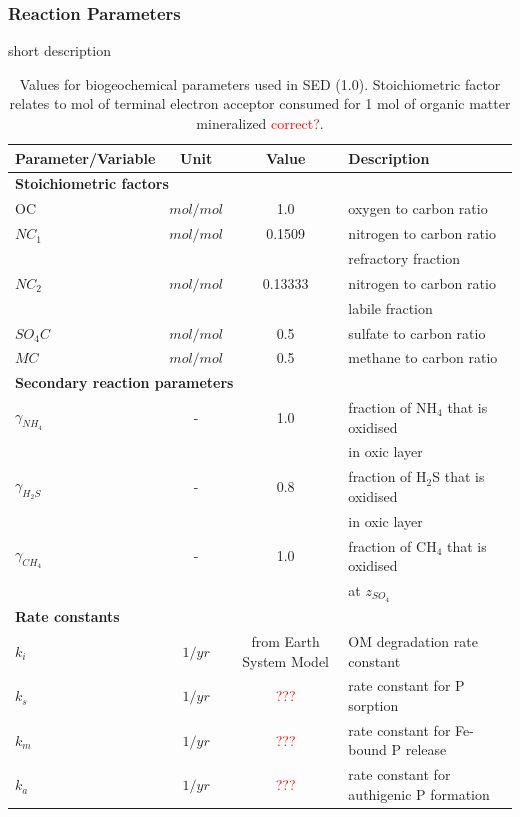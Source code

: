 \documentclass[gmd, manuscript]{copernicus}
\begin{document}
\subsubsection {Reaction Parameters}
short description
\begin{table}[hbtp]
\caption{Values for biogeochemical parameters used in SED (1.0). Stoichiometric factor relates to mol of terminal electron acceptor consumed for 1 mol of organic matter mineralized \textcolor{red}{correct?}.}

\centering
\begin{tabular}{l c c l}
\hline\hline
Parameter/Variable & Unit  & Value & Description\\
\hline
\multicolumn{4}{l}{\textbf{Stoichiometric factors}}\\
OC & $mol/mol$ & 1.0 & oxygen to carbon ratio\\
$NC_1$ & $mol/mol$ & 0.1509 & nitrogen to carbon ratio\\
& & & refractory fraction\\
$NC_2$ & $mol/mol$ & 0.13333 & nitrogen to carbon ratio\\
& & & labile fraction\\
$SO_4C$ & $mol/mol$ & 0.5 & sulfate to carbon ratio\\
$MC$ & $mol/mol$ & 0.5 & methane to carbon ratio\\
\multicolumn{4}{l}{\textbf{Secondary reaction parameters}}\\
$\gamma_{NH_4}$ & - & 1.0 & fraction of NH$_4$ that is oxidised\\
& & & in oxic layer\\
$\gamma_{H_2S}$ & - & 0.8 & fraction of H$_2$S that is oxidised\\
& & & in oxic layer\\
$\gamma_{CH_4}$ & - & 1.0 & fraction of CH$_4$ that is oxidised\\
& & & at $z_{SO_4}$\\
\multicolumn{4}{l}{\textbf{Rate constants}}\\
$k_i$ & $1/yr$ & from Earth System Model & OM degradation rate constant\\
$k_s$ & $1/yr$ & \textcolor{red}{???} & rate constant for P sorption\\
$k_m$ & $1/yr$ & \textcolor{red}{???} & rate constant for Fe-bound P release\\
$k_a$ & $1/yr$ & \textcolor{red}{???} & rate constant for authigenic P formation\\

\hline\hline
\end{tabular}
\label{table:reaction_parameters}
\end{table}
\end{document}
